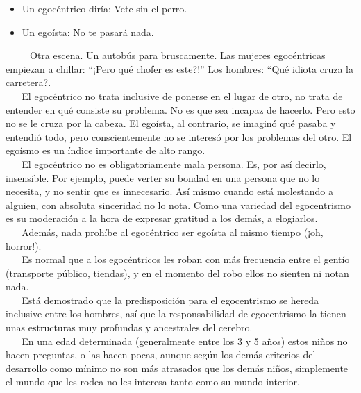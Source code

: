 \begin{itemize}

\item
  Un egocéntrico diría: Vete sin el perro.\\
\item
  Un egoísta: No te pasará nada.
\end{itemize}

~ ~ ~ Otra escena. Un autobús para bruscamente. Las mujeres egocéntricas
empiezan a chillar: ``¡Pero qué chofer es este?!'' Los hombres: ``Qué
idiota cruza la carretera?.\\
\hspace*{0.333em} ~ ~ El egocéntrico no trata inclusive de ponerse en el
lugar de otro, no trata de entender en qué consiste su problema. No es
que sea incapaz de hacerlo. Pero esto no se le cruza por la cabeza. El
egoísta, al contrario, se imaginó qué pasaba y entendió todo, pero
conscientemente no se interesó por los problemas del otro. El egoísmo es
un índice importante de alto rango.\\
\hspace*{0.333em} ~ ~ El egocéntrico no es obligatoriamente mala
persona. Es, por así decirlo, insensible. Por ejemplo, puede verter su
bondad en una persona que no lo necesita, y no sentir que es
innecesario. Así mismo cuando está molestando a alguien, con absoluta
sinceridad no lo nota. Como una variedad del egocentrismo es su
moderación a la hora de expresar gratitud a los demás, a elogiarlos.\\
\hspace*{0.333em} ~ ~ Además, nada prohíbe al egocéntrico ser egoísta al
mismo tiempo (¡oh, horror!).\\
\hspace*{0.333em} ~ ~ Es normal que a los egocéntricos les roban con más
frecuencia entre el gentío (transporte público, tiendas), y en el
momento del robo ellos no sienten ni notan nada.\\
\hspace*{0.333em} ~ ~ Está demostrado que la predisposición para el
egocentrismo se hereda inclusive entre los hombres, así que la
responsabilidad de egocentrismo la tienen unas estructuras muy profundas
y ancestrales del cerebro.\\
\hspace*{0.333em} ~ ~ En una edad determinada (generalmente entre los 3
y 5 años) estos niños no hacen preguntas, o las hacen pocas, aunque
según los demás criterios del desarrollo como mínimo no son más
atrasados que los demás niños, simplemente el mundo que les rodea no les
interesa tanto como su mundo interior.


